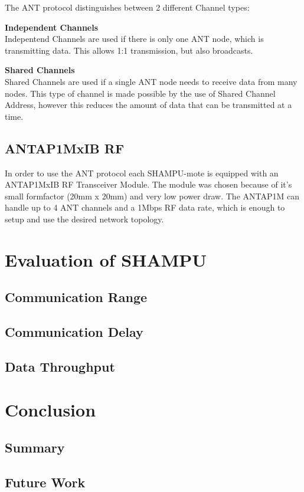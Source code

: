 The ANT protocol distinguishes between 2 different Channel types:
\begin{description}
\item{\textbf{Independent Channels}} \hfill \\ Indepentend Channels are used if there is only one ANT node, which is transmitting data. This allows 1:1 transmission, but also broadcasts.
\item{\textbf{Shared Channels}} \hfill \\ Shared Channels are used if a single ANT node needs to receive data from many nodes. This type of channel is made possible by the use of Shared Channel Address, however this reduces the amount of data that can be transmitted at a time.
\end{description}

\section{ANTAP1MxIB RF}
In order to use the ANT protocol each SHAMPU-mote is equipped with an ANTAP1MxIB RF Transceiver Module. The module was chosen because of it's small formfactor (20mm x 20mm) and very low power draw. The ANTAP1M can handle up to 4 ANT channels and a 1Mbps RF data rate, which is enough to setup and use the desired network topology.

\chapter{Evaluation of SHAMPU}
\section{Communication Range}
\section{Communication Delay}
\section{Data Throughput}


\chapter{Conclusion}
\section{Summary}
\section{Future Work}
